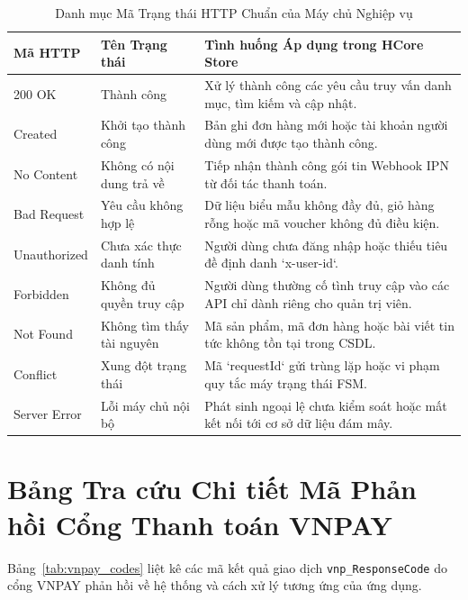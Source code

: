 \documentclass[12pt,a4paper]{report}
\begin{document}
\begin{table}[H]
\centering
\caption{Danh mục Mã Trạng thái HTTP Chuẩn của Máy chủ Nghiệp vụ}
\label{tab:http_codes}
\begin{tabularx}{\textwidth}{p{2.5cm}p{4cm}X}
\toprule
\textbf{Mã HTTP} & \textbf{Tên Trạng thái} & \textbf{Tình huống Áp dụng trong HCore Store} \\
\midrule
200 OK & Thành công & Xử lý thành công các yêu cầu truy vấn danh mục, tìm kiếm và cập nhật. \\
\addlinespace
201 Created & Khởi tạo thành công & Bản ghi đơn hàng mới hoặc tài khoản người dùng mới được tạo thành công. \\
\addlinespace
204 No Content & Không có nội dung trả về & Tiếp nhận thành công gói tin Webhook IPN từ đối tác thanh toán. \\
\addlinespace
400 Bad Request & Yêu cầu không hợp lệ & Dữ liệu biểu mẫu không đầy đủ, giỏ hàng rỗng hoặc mã voucher không đủ điều kiện. \\
\addlinespace
401 Unauthorized& Chưa xác thực danh tính & Người dùng chưa đăng nhập hoặc thiếu tiêu đề định danh `x-user-id`. \\
\addlinespace
403 Forbidden & Không đủ quyền truy cập & Người dùng thường cố tình truy cập vào các API chỉ dành riêng cho quản trị viên. \\
\addlinespace
404 Not Found & Không tìm thấy tài nguyên & Mã sản phẩm, mã đơn hàng hoặc bài viết tin tức không tồn tại trong CSDL. \\
\addlinespace
409 Conflict & Xung đột trạng thái & Mã `requestId` gửi trùng lặp hoặc vi phạm quy tắc máy trạng thái FSM. \\
\addlinespace
500 Server Error& Lỗi máy chủ nội bộ & Phát sinh ngoại lệ chưa kiểm soát hoặc mất kết nối tới cơ sở dữ liệu đám mây. \\
\bottomrule
\end{tabularx}
\end{table}

\section{Bảng Tra cứu Chi tiết Mã Phản hồi Cổng Thanh toán VNPAY}
Bảng~\ref{tab:vnpay_codes} liệt kê các mã kết quả giao dịch \texttt{vnp\_ResponseCode} do cổng VNPAY phản hồi về hệ thống và cách xử lý tương ứng của ứng dụng.
\end{document}

